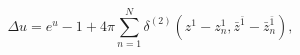 \begin{equation}
 \Delta u=e^u-1+4\pi\sum_{n=1}^N\delta^{(2)}(z^1-z^1_n,\bar{z}^{\bar{1}}
 -\bar{z}^{\bar{1}}_n),
\end{equation} 
